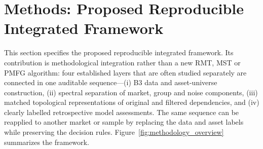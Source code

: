 \section{Methods: Proposed Reproducible Integrated Framework}
\label{sec:methodology}

This section specifies the proposed reproducible integrated framework. Its contribution is methodological integration rather than a new RMT, MST or PMFG algorithm: four established layers that are often studied separately are connected in one auditable sequence---(i) B3 data and asset-universe construction, (ii) spectral separation of market, group and noise components, (iii) matched topological representations of original and filtered dependencies, and (iv) clearly labelled retrospective model assessments. The same sequence can be reapplied to another market or sample by replacing the data and asset labels while preserving the decision rules. Figure~\ref{fig:methodology_overview} summarizes the framework.

